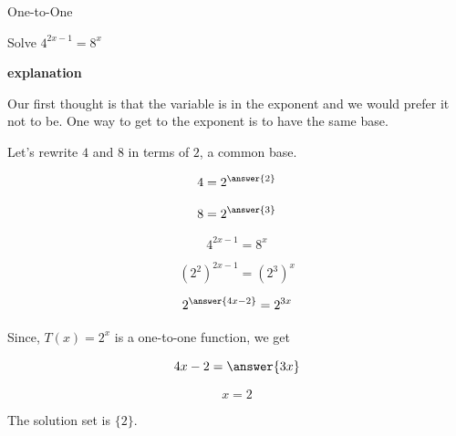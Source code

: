 \documentclass{ximera}
\begin{document}
\begin{example} One-to-One


Solve $4^{2x-1} = 8^x$



\textbf{\textcolor{red!75!green}{explanation}} 

Our first thought is that the variable is in the exponent and we would prefer it not to be.  One way to get to the exponent is to have the same base.

Let's rewrite $4$ and $8$ in terms of $2$, a common base.

\[  4 = 2^{\answer{2}} \]

\[  8 = 2^{\answer{3}} \]



\[  4^{2x-1} = 8^x  \]

\[  (2^2)^{2x-1} = (2^3)^x  \]

\[  2^{\answer{4x-2}} = 2^{3x}  \]


Since, $T(x) = 2^x$ is a one-to-one function, we get


\[  4x-2  = \answer{3x}   \]


\[ x = 2 \]

The solution set is $\{ 2 \}$.



\end{example}
\end{document}
